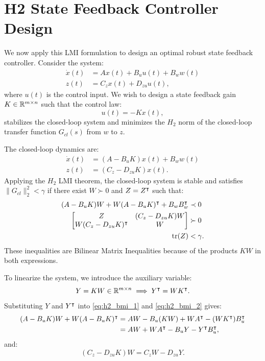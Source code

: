 \section{H2 State Feedback Controller Design}
We now apply this LMI formulation to design an optimal robust state feedback controller. Consider the system:
\begin{align}
    \dot{x}(t) &= A x(t) + B_u u(t) + B_w w(t) \\
z(t) &= C_z x(t) + D_{zu} u(t) ,
\end{align}
where $u(t)$ is the control input. We wish to design a state feedback gain $K \in \mathbb{R}^{m \times n}$ such that the control law:
\begin{equation}
u(t) = -K x(t) ,
\end{equation}
stabilizes the closed-loop system and minimizes the $H_2$ norm of the closed-loop transfer function $G_{cl}(s)$ from $w$ to $z$.

The closed-loop dynamics are:
\begin{align}
    \dot{x}(t) &= (A - B_u K) x(t) + B_w w(t) \\
z(t) &= (C_z - D_{zu} K) x(t) .
\end{align}
Applying the $H_2$ LMI theorem, the closed-loop system is stable and satisfies $\| G_{cl} \|_2^2 < \gamma$ if there exist $W \succ 0$ and $Z = Z^\intercal$ such that:
\begin{align}
    (A - B_u K) W + W (A - B_u K)^\intercal + B_w B_w^\intercal &\prec 0 \label{eq:h2_bmi_1} \\
    \begin{bmatrix} Z & (C_z - D_{zu} K) W \\ W (C_z - D_{zu} K)^\intercal & W \end{bmatrix} &\succ 0 \label{eq:h2_bmi_2} \\
\operatorname{tr}(Z) &< \gamma .
\end{align}
These inequalities are Bilinear Matrix Inequalities because of the products $KW$ in both expressions.

To linearize the system, we introduce the auxiliary variable:
\begin{equation}
Y = K W \in \mathbb{R}^{m \times n} \implies Y^\intercal = W K^\intercal .
\end{equation}
Substituting $Y$ and $Y^\intercal$ into \eqref{eq:h2_bmi_1} and \eqref{eq:h2_bmi_2} gives:
\begin{align}
    (A - B_u K) W + W (A - B_u K)^\intercal &= A W - B_u (KW) + W A^\intercal - (W K^\intercal) B_u^\intercal \nonumber \\
&= A W + W A^\intercal - B_u Y - Y^\intercal B_u^\intercal ,
\end{align}
and:
\begin{equation}
(C_z - D_{zu} K) W = C_z W - D_{zu} Y .
\end{equation}

